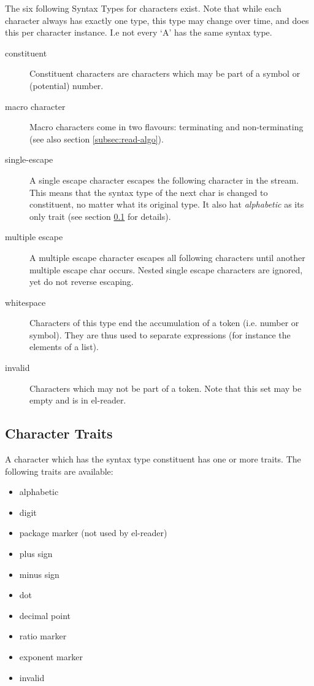 \documentclass[a4paper,10pt,twoside]{report}
\newcommand{\elr}{el-reader}
\begin{document}
The six following Syntax Types for characters exist.  Note that while each
character always has exactly one type, this type may change over time, and does
this per character instance.  I.e not every `A' has the same syntax type.

\begin{description}
\item[constituent] Constituent characters are characters which may be part of a
  symbol or (potential) number.
\item[macro character] Macro characters come in two flavours: terminating and
  non-terminating (see also section \ref{subsec:read-algo}).
\item[single-escape] A single escape character escapes the following character
  in the stream.  This means that the syntax type of the next char is changed to
  constituent, no matter what its original type.  It also hat \emph{alphabetic}
  as its only trait (see section \ref{subsubsec:traits} for details).
\item[multiple escape] A multiple escape character escapes all following
  characters until another multiple escape char occurs.  Nested single escape
  characters are ignored, yet do not reverse escaping.
\item[whitespace] Characters of this type end the accumulation of a token
  (i.e. number or symbol).  They are thus used to separate expressions (for
  instance the elements of a list).
\item[invalid] Characters which may not be part of a token.  Note that this set
  may be empty and is in \elr{}.
\end{description}

\subsection{Character Traits}
\label{subsubsec:traits}

A character which has the syntax type constituent has one or more traits.
The following traits are available:

\begin{itemize}
\item alphabetic
\item digit
\item package marker (not used by \elr{})
\item plus sign
\item minus sign
\item dot
\item decimal point
\item ratio marker
\item exponent marker
\item invalid
\end{itemize}
\end{document}
